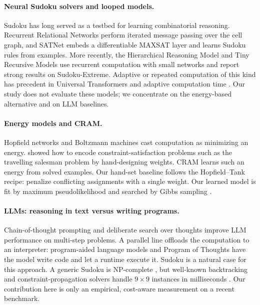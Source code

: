 \documentclass{article} %
\begin{document}
\paragraph{Neural Sudoku solvers and looped models.} Sudoku has long served as a testbed for learning combinatorial reasoning. Recurrent Relational Networks \citep{palm2018recurrent} perform iterated message passing over the cell graph, and SATNet \citep{wang2019satnet} embeds a differentiable MAXSAT layer and learns Sudoku rules from examples. More recently, the Hierarchical Reasoning Model \citep{wang2025hrm} and Tiny Recursive Models \citep{jolicoeur2025trm} use recurrent computation with small networks and report strong results on Sudoku-Extreme. Adaptive or repeated computation of this kind has precedent in Universal Transformers \citep{dehghani2019universal} and adaptive computation time \citep{graves2016adaptive}. Our study does not evaluate these models; we concentrate on the energy-based alternative and on LLM baselines.

\paragraph{Energy models and CRAM.} Hopfield networks \citep{hopfield1982neural} and Boltzmann machines \citep{ackley1985learning} cast computation as minimizing an energy. \citet{hopfield1985neural} showed how to encode constraint-satisfaction problems such as the travelling salesman problem by hand-designing weights. CRAM \citep{hoover2026cram} learns such an energy from solved examples. Our hand-set baseline follows the Hopfield--Tank recipe: penalize conflicting assignments with a single weight. Our learned model is fit by maximum pseudolikelihood \citep{besag1975statistical} and searched by Gibbs sampling \citep{geman1984stochastic}.

\paragraph{LLMs: reasoning in text versus writing programs.} Chain-of-thought prompting \citep{wei2022chain} and deliberate search over thoughts \citep{yao2023tree} improve LLM performance on multi-step problems. A parallel line offloads the computation to an interpreter: program-aided language models \citep{gao2023pal} and Program of Thoughts \citep{chen2022program} have the model write code and let a runtime execute it. Sudoku is a natural case for this approach. A generic Sudoku is NP-complete \citep{yato2003complexity}, but well-known backtracking and constraint-propagation solvers handle $9\times 9$ instances in milliseconds \citep{norvig2006solving,knuth2000dancing}. Our contribution here is only an empirical, cost-aware measurement on a recent benchmark.
\end{document}
